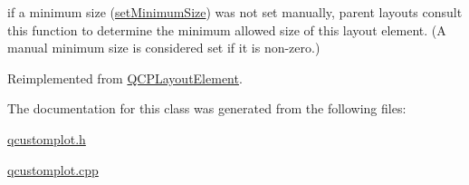 if a minimum size (\hyperlink{classQCPLayoutElement_a5dd29a3c8bc88440c97c06b67be7886b}{set\+Minimum\+Size}) was not set manually, parent layouts consult this function to determine the minimum allowed size of this layout element. (A manual minimum size is considered set if it is non-\/zero.) 

Reimplemented from \hyperlink{classQCPLayoutElement_aebe14fb71f858c0f98caf8d342a9864a}{Q\+C\+P\+Layout\+Element}.



The documentation for this class was generated from the following files\+:\begin{DoxyCompactItemize}
\item 
\hyperlink{qcustomplot_8h}{qcustomplot.\+h}\item 
\hyperlink{qcustomplot_8cpp}{qcustomplot.\+cpp}\end{DoxyCompactItemize}
